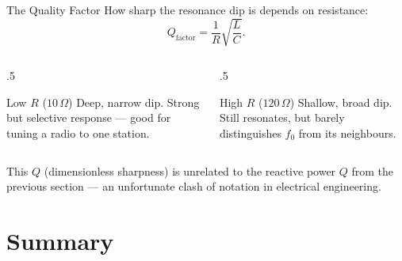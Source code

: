 \documentclass[9pt,aspectratio=169,xcolor=table]{beamer}
\begin{document}
\begin{frame}{The Quality Factor}
    \leavevmode
    How sharp the resonance dip is depends on resistance:
    \[
    Q_{\text{factor}} = \frac{1}{R}\sqrt{\frac{L}{C}}.
    \]

    \vspace{3mm}
    \begin{columns}[t]
        \begin{column}{.5\textwidth}
            \begin{block}{Low $R$ ($10\,\Omega$)}
                \small Deep, narrow dip. Strong but selective response
                --- good for tuning a radio to one station.
            \end{block}
        \end{column}
        \begin{column}{.5\textwidth}
            \begin{alertblock}{High $R$ ($120\,\Omega$)}
                \small Shallow, broad dip. Still resonates, but barely
                distinguishes $f_0$ from its neighbours.
            \end{alertblock}
        \end{column}
    \end{columns}

    \vspace{3mm}
    {\scriptsize This $Q$ (dimensionless sharpness) is unrelated to the
    reactive power $Q$ from the previous section --- an unfortunate
    clash of notation in electrical engineering.}
\end{frame}

\section{Summary}
\end{document}
